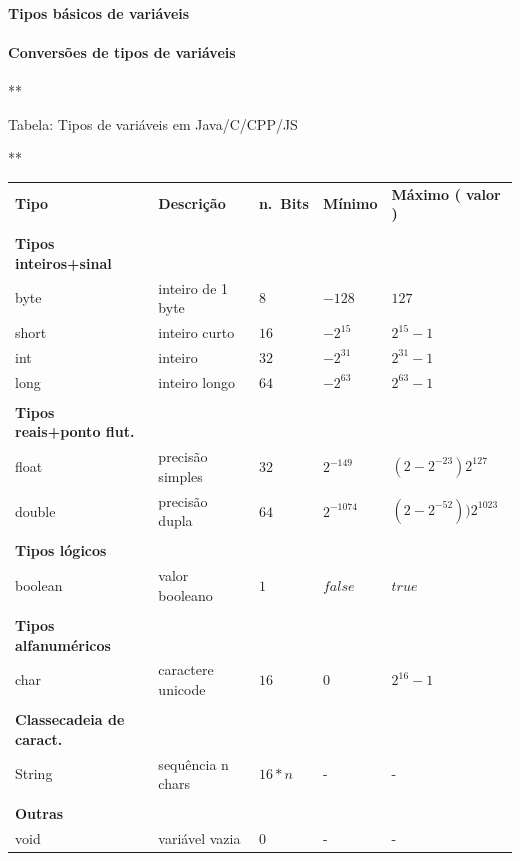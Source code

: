 \documentclass[12pt,a4paper]{article}
\begin{document}
    \hypertarget{tipos-buxe1sicos-de-variuxe1veis}{%
\paragraph{Tipos básicos de
variáveis}\label{tipos-buxe1sicos-de-variuxe1veis}}

    \hypertarget{conversuxf5es-de-tipos-de-variuxe1veis}{%
\paragraph{Conversões de tipos de
variáveis}\label{conversuxf5es-de-tipos-de-variuxe1veis}}

    **

Tabela: Tipos de variáveis em Java/C/CPP/JS

**

\begin{longtable}[]{@{}
  >{\raggedright\arraybackslash}p{}
  >{\raggedright\arraybackslash}p{}
  >{\raggedright\arraybackslash}p{}
  >{\raggedright\arraybackslash}p{}
  >{\raggedright\arraybackslash}p{}@{}}
\toprule()
\endhead
\textbf{Tipo} & \textbf{Descrição} & \textbf{n.~Bits} & \textbf{Mínimo}
& \textbf{Máximo ( valor )} \\
& & & & \\
\textbf{Tipos inteiros+sinal} & & & & \\
byte & inteiro de 1 byte & \(8\) & \(-128\) & \(127\) \\
short & inteiro curto & \(16\) & \(-2^{15}\) & \(2^{15}-1\) \\
int & inteiro & \(32\) & \(-2^{31}\) & \(2^{31}-1\) \\
long & inteiro longo & \(64\) & \(-2^{63}\) & \(2^{63}-1\) \\
& & & & \\
\textbf{Tipos reais+ponto flut.} & & & & \\
float & precisão simples & \(32\) & \(2^{-149}\) &
\((2-2^{-23})2^{127}\) \\
double & precisão dupla & \(64\) & \(2^{-1074}\) &
\((2-2^{-52}))2^{1023}\) \\
& & & & \\
\textbf{Tipos lógicos} & & & & \\
boolean & valor booleano & \(1\) & \(false\) & \(true\) \\
& & & & \\
\textbf{Tipos alfanuméricos} & & & & \\
char & caractere unicode & \(16\) & \(0\) & \(2^{16}-1\) \\
& & & & \\
\textbf{Classecadeia de caract.} & & & & \\
String & sequência n chars & \(16*n\) & - & - \\
& & & & \\
\textbf{Outras} & & & & \\
void & variável vazia & \(0\) & - & - \\
\bottomrule()
\end{longtable}
\end{document}
